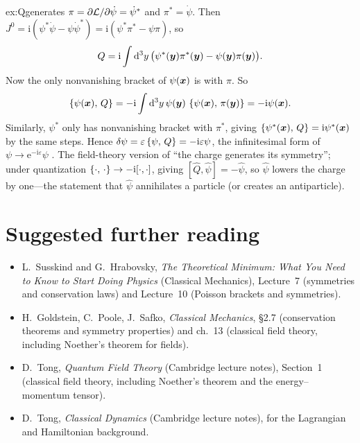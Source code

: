 \documentclass[11pt]{article}
\newcommand{\eps}{\varepsilon}
\begin{document}
\begin{solution}{ex:Qgenerates}
$\pi=\partial\mathcal{L}/\partial\dot\psi=\dot\psi^*$ and $\pi^*=\dot\psi$. Then $J^0=\mathrm i(\psi^*\dot\psi-\psi\dot\psi^*)=\mathrm i(\psi^*\pi^*-\psi\pi)$, so
\begin{equation}
  Q=\mathrm i\int\mathrm{d}^3y\,\big(\psi^*(\bm{y})\pi^*(\bm{y})-\psi(\bm{y})\pi(\bm{y})\big).
\end{equation}
Now the only nonvanishing bracket of $\psi(\bm{x})$ is with $\pi$. So
\begin{equation*}
  \left\{\psi(\bm{x}),\,Q\right\}=-\mathrm i\int\mathrm{d}^3y\,\psi(\bm{y})\,\left\{\psi(\bm{x}),\,\pi(\bm{y})\right\}=-\mathrm i\psi(\bm{x}).
\end{equation*} Similarly, $\psi^*$ only has nonvanishing bracket with $\pi^*$, giving $\left\{\psi^*(\bm{x}),\,Q\right\}=\mathrm i\psi^*(\bm{x})$ by the same steps. Hence $\delta\psi=\eps\pb{\psi}{Q}=-\mathrm i\eps\psi$, the infinitesimal form of $\psi\to\mathrm e^{-\mathrm i\eps}\psi$ \checkmark. The field-theory version of ``the charge generates its symmetry''; under quantization $\left\{\cdot,\,\cdot\right\}\to-\mathrm i[\cdot,\cdot]$, giving $[\hat Q,\hat\psi]=-\hat\psi$, so $\hat\psi$ lowers the charge by one---the statement that $\hat\psi$ annihilates a particle (or creates an antiparticle).
\end{solution}

\section*{Suggested further reading}
\begin{itemize}[nosep]
  \item L.~Susskind and G.~Hrabovsky, \emph{The Theoretical Minimum: What You Need to Know to Start Doing Physics} (Classical Mechanics), Lecture~7 (symmetries and conservation laws) and Lecture~10 (Poisson brackets and symmetries).
  \item H.~Goldstein, C.~Poole, J.~Safko, \emph{Classical Mechanics}, \S2.7 (conservation theorems and symmetry properties) and ch.~13 (classical field theory, including Noether's theorem for fields).
  \item D.~Tong, \emph{Quantum Field Theory} (Cambridge lecture notes), Section~1 (classical field theory, including Noether's theorem and the energy--momentum tensor).
  \item D.~Tong, \emph{Classical Dynamics} (Cambridge lecture notes), for the Lagrangian and Hamiltonian background.
\end{itemize}
\end{document}
